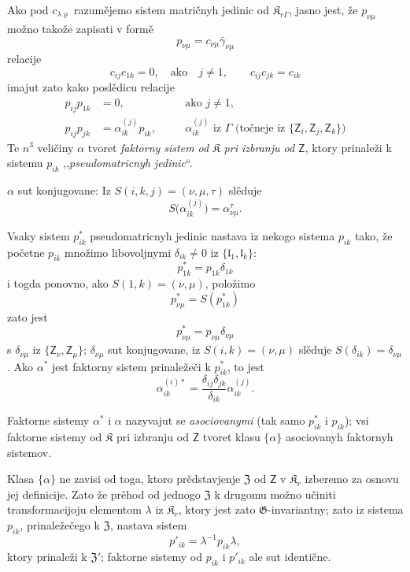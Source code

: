 \documentclass[11pt]{article}
\begin{document}
Ako pod \(c_{\lambda\varrho}\) razumějemo sistem matričnyh jedinic od \(\mathfrak K_{r\Gamma}\), jasno jest, že \(p_{\nu\mu}\) možno takože zapisati v formě
\[
p_{\nu\mu}=c_{\nu\mu}\bar\gamma_{\nu\mu}
\]
relacije
\[
c_{ij}c_{1k}=0,\quad\text{ako}\quad j\ne1,
\qquad
c_{ij}c_{jk}=c_{ik}
\]
imajut zato kako poslědicu relacije
\[
\begin{aligned}
p_{ij}p_{1k}&=0,\quad &&\text{ako }j\ne1,\\
p_{ij}p_{jk}&=\alpha_{ik}^{(j)}p_{ik},\quad
&&\alpha_{ik}^{(j)}\text{ iz }\Gamma\text{ (točneje iz }\{\mathsf{Z}_i,\mathsf{Z}_j,\mathsf{Z}_k\}\text{)}
\end{aligned}
\]
Te \(n^3\) veličiny \(\alpha\) tvoret \emph{faktorny sistem od \(\mathfrak K\) pri izbranju od \(\mathsf{Z}\)}, ktory prinaleži k sistemu \(p_{ik}\) ,,\emph{pseudomatricnyh jedinic}``.

\(\alpha\) sut konjugovane: Iz \(S(i,k,j)=(\nu,\mu,\tau)\) slěduje
\[
S\bigl(\alpha_{ik}^{(j)}\bigr)=\alpha_{\nu\mu}^{\tau}.
\]

Vsaky sistem \(p_{ik}^*\) pseudomatricnyh jedinic nastava iz nekogo sistema \(p_{ik}\) tako, že početne \(p_{ik}\) množimo libovoljnymi \(\delta_{ik}\ne0\) iz \(\{\mathfrak l_1,\mathfrak l_k\}\):
\[
p_{1k}^*=p_{1k}\delta_{1k}
\]
i togda ponovno, ako \(S(1,k)=(\nu,\mu)\), položimo
\[
p_{\nu\mu}^*=S(p_{1k}^*)
\]
zato jest
\[
p_{\nu\mu}^*=p_{\nu\mu}\delta_{\nu\mu}
\]
s \(\delta_{\nu\mu}\) iz \(\{\mathsf{Z}_\nu,\mathsf{Z}_\mu\}\); \(\delta_{\nu\mu}\) sut konjugovane, iz \(S(i,k)=(\nu,\mu)\) slěduje \(S(\delta_{ik})=\delta_{\nu\mu}\). Ako \(\alpha^*\) jest faktorny sistem prinaležeči k \(p_{ik}^*\), to jest
\[
\alpha_{ik}^{(i)*}=\frac{\delta_{ij}\delta_{jk}}{\delta_{ik}}\alpha_{ik}^{(j)}.
\]

Faktorne sistemy \(\alpha^*\) i \(\alpha\) nazyvajut se \emph{asociovanymi} (tak samo \(p_{ik}^*\) i \(p_{ik}\)); vsi faktorne sistemy od \(\mathfrak K\) pri izbranju od \(\mathsf{Z}\) tvoret klasu \(\{\alpha\}\) asociovanyh faktornyh sistemov.

Klasa \(\{\alpha\}\) ne zavisi od toga, ktoro prědstavjenje \(\mathfrak Z\) od \(\mathsf{Z}\) v \(\mathfrak K_r\) izberemo za osnovu jej definicije. Zato že prěhod od jednogo \(\mathfrak Z\) k drugomu možno učiniti transformacijoju elementom \(\lambda\) iz \(\mathfrak K_r\), ktory jest zato \(\mathfrak G\)-invariantny; zato iz sistema \(p_{ik}\), prinaležečego k \(\mathfrak Z\), nastava sistem
\[
p'_{ik}=\lambda^{-1}p_{ik}\lambda,
\]
ktory prinaleži k \(\mathfrak Z'\); faktorne sistemy od \(p_{ik}\) i \(p'_{ik}\) ale sut identične.
\end{document}
